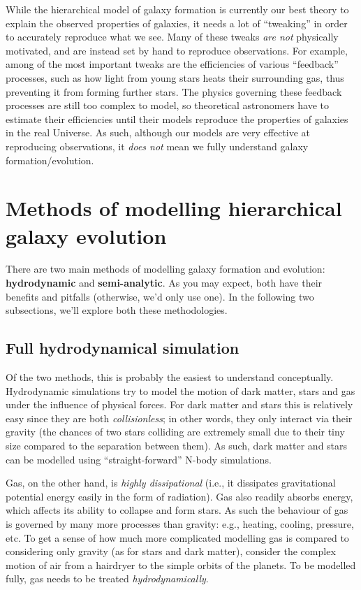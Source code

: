 \documentclass[11pt]{article}
\begin{document}
While the hierarchical model of galaxy formation is currently our best
theory to explain the observed properties of galaxies, it needs a lot
of ``tweaking'' in order to accurately reproduce what we see. Many of
these tweaks {\it are not} physically motivated, and are instead set
by hand to reproduce observations. For example, among of the most
important tweaks are the efficiencies of various ``feedback''
processes, such as how light from young stars heats their surrounding
gas, thus preventing it from forming further stars. The physics
governing these feedback processes are still too complex to model, so
theoretical astronomers have to estimate their efficiencies until
their models reproduce the properties of galaxies in the real
Universe. As such, although our models are very effective at
reproducing observations, it {\it does not} mean we fully understand
galaxy formation/evolution.

\section{Methods of modelling hierarchical galaxy evolution}
There are two main methods of modelling galaxy formation and
evolution: {\bf hydrodynamic} and {\bf semi-analytic}. As you may
expect, both have their benefits and pitfalls (otherwise, we'd only
use one). In the following two subsections, we'll explore both these
methodologies.

\subsection{Full hydrodynamical simulation}
Of the two methods, this is probably the easiest to understand
conceptually. Hydrodynamic simulations try to model the motion of dark
matter, stars and gas under the influence of physical forces. For dark
matter and stars this is relatively easy since they are both {\it
  collisionless}; in other words, they only interact via their gravity
(the chances of two stars colliding are extremely small due to their
tiny size compared to the separation between them). As such, dark
matter and stars can be modelled using ``straight-forward'' N-body
simulations.

Gas, on the other hand, is {\it highly dissipational} (i.e., it
dissipates gravitational potential energy easily in the form of radiation). Gas also readily
absorbs energy, which affects its ability to collapse and form
stars. As such the behaviour of gas is governed by many more processes
than gravity: e.g., heating, cooling, pressure, etc. To get a sense of
how much more complicated modelling gas is compared to considering
only gravity (as for stars and dark matter), consider the complex
motion of air from a hairdryer to the simple orbits of the planets. To
be modelled fully, gas needs to be treated {\it hydrodynamically}.
\end{document}
